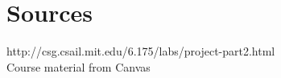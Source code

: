 \documentclass{article}
\begin{document}






\section{Sources}

http://csg.csail.mit.edu/6.175/labs/project-part2.html
\\
Course material from Canvas
\end{document}
